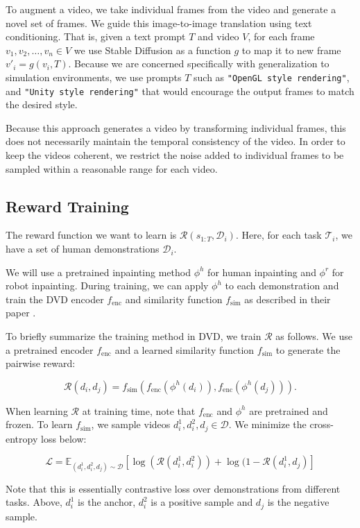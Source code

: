 To augment a video, we take individual frames from the video and generate a novel set of frames. We guide this image-to-image translation using text conditioning. That is, given a text prompt $T$ and video $V$, for each frame $ v_1, v_2, \dots, v_n \in V$ we use Stable Diffusion as a function $g$ to map it to new frame $v'_i = g(v_i, T)$. Because we are concerned specifically with generalization to simulation environments, we use prompts $T$ such as \verb|"OpenGL style rendering"|, and \verb|"Unity style rendering"| that would encourage the output frames to match the desired style.

Because this approach generates a video by transforming individual frames, this does not necessarily maintain the temporal consistency of the video. In order to keep the videos coherent, we restrict the noise added to individual frames to be sampled within a reasonable range for each video.

\subsection{Reward Training}
The reward function we want to learn is $\mathcal{R} (s_{1:T}, \mathcal{D}_i)$. Here, for each task $\mathcal{T}_i$, we have a set of human demonstrations $\mathcal{D}_i$.

We will use a pretrained inpainting method $\phi^h$ for human inpainting and $\phi^r$ for robot inpainting. During training, we can apply $\phi^h$ to each demonstration and train the DVD encoder $f_{\text{enc}}$ and similarity function $f_{\text{sim}}$ as described in their paper \cite{DVD}.

To briefly summarize the training method in DVD, we train $\mathcal{R}$ as follows. We use a pretrained encoder $f_{\text{enc}}$ and a learned similarity function $f_{\text{sim}}$ to generate the pairwise reward:

$$\mathcal{R}(d_i, d_j) = f_{\text{sim}}(f_{\text{enc}}(\phi^h(d_i)), f_{\text{enc}}(\phi^h(d_j))).$$

When learning $\mathcal{R}$ at training time, note that $f_{\text{enc}}$ and $\phi^h$ are pretrained and frozen. To learn $f_{\text{sim}}$, we sample videos $d_i^1, d_i^2, d_j \in \mathcal{D}$. We minimize the cross-entropy loss below:

$$\mathcal{L} = \mathbb{E}_{(d_i^1, d_i^2, d_j) \sim \mathcal{D}} [\log (\mathcal{R}(d_i^1, d_i^2)) + \log (1 - \mathcal{R}(d_i^1, d_j)]$$

Note that this is essentially contrastive loss over demonstrations from different tasks. Above, $d_i^1$ is the anchor, $d_i^2$ is a positive sample and $d_j$ is the negative sample.

